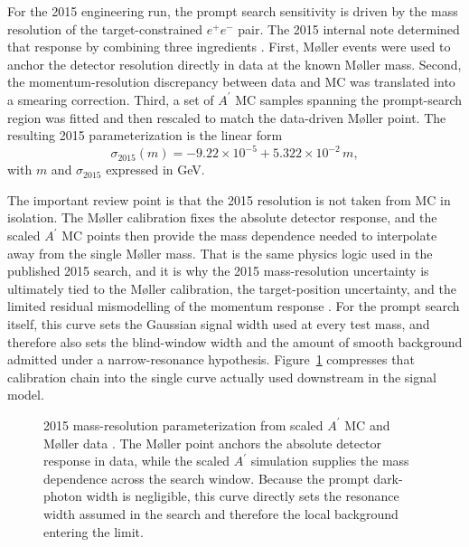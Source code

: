 For the 2015 engineering run, the prompt search sensitivity is driven by the mass
resolution of the target-constrained $e^+e^-$ pair. The 2015 internal note determined
that response by combining three ingredients \cite{HPS2015InternalNote}. First, M{\o}ller
events were used to anchor the detector resolution directly in data at the known
M{\o}ller mass. Second, the momentum-resolution discrepancy between data and MC was
translated into a smearing correction. Third, a set of $A^\prime$ MC samples spanning
the prompt-search region was fitted and then rescaled to match the data-driven M{\o}ller
point. The resulting 2015 parameterization is the linear form
\begin{equation}
\sigma_{2015}(m) = -9.22\times10^{-5} + 5.322\times10^{-2}\,m,
\label{eq:sigma2015}
\end{equation}
with $m$ and $\sigma_{2015}$ expressed in GeV.

The important review point is that the 2015 resolution is not taken from MC in
isolation. The M{\o}ller calibration fixes the absolute detector response, and the
scaled $A^\prime$ MC points then provide the mass dependence needed to interpolate away
from the single M{\o}ller mass. That is the same physics logic used in the published
2015 search, and it is why the 2015 mass-resolution uncertainty is ultimately tied to
the M{\o}ller calibration, the target-position uncertainty, and the limited residual
mismodelling of the momentum response \cite{HPS2015DarkPhoton,HPS2015InternalNote}.
For the prompt search itself, this curve sets the Gaussian signal width used at every
test mass, and therefore also sets the blind-window width and the amount of smooth
background admitted under a narrow-resonance hypothesis. Figure~\ref{fig:2015-resolution}
compresses that calibration chain into the single curve actually used downstream in the
signal model.

\begin{figure}[H]
\centering
{}
\caption{2015 mass-resolution parameterization from scaled $A^\prime$ MC and M{\o}ller
data \cite{HPS2015InternalNote}. The M{\o}ller point anchors the absolute detector
response in data, while the scaled $A^\prime$ simulation supplies the mass dependence
across the search window. Because the prompt dark-photon width is negligible, this
curve directly sets the resonance width assumed in the search and therefore the local
background entering the limit.}
\label{fig:2015-resolution}
\end{figure}

